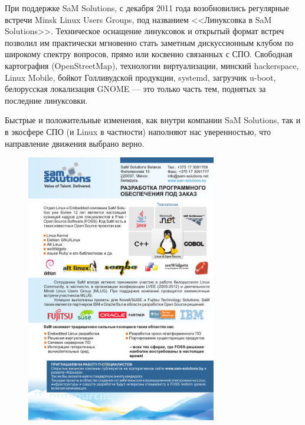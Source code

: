 \documentclass[10pt, a5paper]{article}
\begin{document}
При поддержке SaM Solutions, с декабря 2011 года возобновились регулярные встречи Minsk Linux Users Groups, под названием <<Линуксовка в SaM Solutions>>. Техническое оснащение линуксовок и открытый формат встреч позволил им практически мгновенно стать заметным дискуссионным клубом по широкому спектру вопросов, прямо или косвенно связанных с СПО. Свободная картография (OpenStreetMap), технологии виртуализации, минский \linebreak hackerspace, Linux Mobile, бойкот Голливудской продукции, systemd, загрузчик u-boot, белорусская локализация GNOME --- это только часть тем, поднятых за последние линуксовки.

Быстрые и положительные изменения, как внутри компании SaM Solutions, так и в экосфере СПО (и Linux в частности) наполняют нас уверенностью, что направление движения выбрано верно.

\begin{figure}[h!]
\centering
\includegraphics[height=11.8cm]{48_spons_sams.pdf}
\end{figure}
\end{document}
